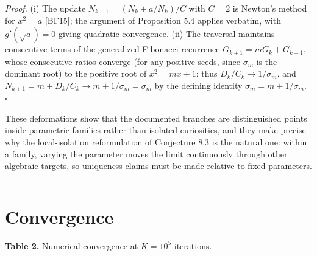 \documentclass[12pt]{article}
\begin{document}
\emph{Proof.} (i) The update \(N_{k+1} = (N_k + a/N_k)/C\) with
\(C = 2\) is Newton's method for \(x^2 = a\) {[}BF15{]}; the argument of
Proposition 5.4 applies verbatim, with \(g'(\sqrt{a}) = 0\) giving
quadratic convergence. (ii) The traversal maintains consecutive terms of
the generalized Fibonacci recurrence \(G_{k+1} = m G_k + G_{k-1}\),
whose consecutive ratios converge (for any positive seeds, since
\(\sigma_m\) is the dominant root) to the positive root of
\(x^2 = mx + 1\): thus \(D_k / C_k \to 1/\sigma_m\), and
\(N_{k+1} = m + D_k/C_k \to m + 1/\sigma_m = \sigma_m\) by the defining
identity \(\sigma_m = m + 1/\sigma_m\). \(\square\)

These deformations show that the documented branches are distinguished
points inside parametric families rather than isolated curiosities, and
they make precise why the local-isolation reformulation of Conjecture
8.3 is the natural one: within a family, varying the parameter moves the
limit continuously through other algebraic targets, so uniqueness claims
must be made relative to fixed parameters.

\begin{center}\rule{0.5\linewidth}{0.5pt}\end{center}

\section{Convergence}\label{convergence}

\textbf{Table 2.} Numerical convergence at \(K = 10^5\) iterations.
\end{document}
